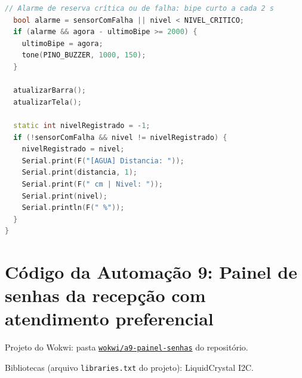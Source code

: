 \documentclass[12pt]{article}
\newcommand{\repositorio}{https://github.com/santanathalles76-tech/Trabalho-sistemas-embarcadosA2}
\newcommand{\simlink}[1]{\href{\repositorio/tree/main/wokwi/#1}{\texttt{wokwi/#1}}}
\begin{document}
\begin{lstlisting}[language=C++]
  // Alarme de reserva crítica ou de falha: bipe curto a cada 2 s
  bool alarme = sensorComFalha || nivel < NIVEL_CRITICO;
  if (alarme && agora - ultimoBipe >= 2000) {
    ultimoBipe = agora;
    tone(PINO_BUZZER, 1000, 150);
  }

  atualizarBarra();
  atualizarTela();

  static int nivelRegistrado = -1;
  if (!sensorComFalha && nivel != nivelRegistrado) {
    nivelRegistrado = nivel;
    Serial.print(F("[AGUA] Distancia: "));
    Serial.print(distancia, 1);
    Serial.print(F(" cm | Nivel: "));
    Serial.print(nivel);
    Serial.println(F(" %"));
  }
}
\end{lstlisting}

\section{Código da Automação 9: Painel de senhas da recepção com atendimento preferencial}\label{ap:a9}

\noindent Projeto do Wokwi: pasta \simlink{a9-painel-senhas} do repositório.

\noindent Bibliotecas (arquivo \texttt{libraries.txt} do projeto): LiquidCrystal I2C.
\end{document}
